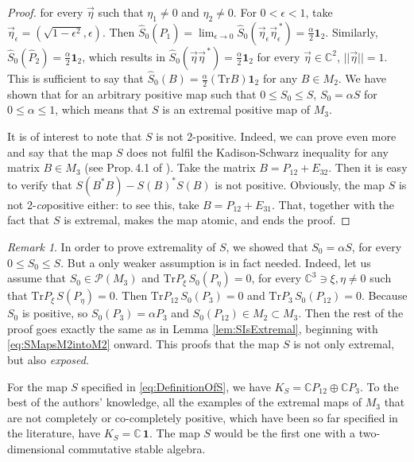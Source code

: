 \documentclass[12pt]{article}
\theoremstyle{plain}
\theoremstyle{definition}
\theoremstyle{remark}
\newtheorem*{remark*}{Remark}
\numberwithin{equation}{section}
\begin{document}
\begin{proof}
for every $\vec{\eta}$ such that $\eta_{1} \neq 0$ and $\eta_{2} \neq 0$.
For $0 \!<\!\epsilon \!<\! 1$,
take $\vec{\eta}_{\epsilon} = (\sqrt{1 - \epsilon^{2}}, \epsilon)$.
Then $\hat{S}_{0} (\hat{P}_{1}) = 
\lim_{\epsilon \rightarrow 0} \hat{S}_{0}
    (\vec{\eta}_{\epsilon} \vec{\eta}_{\epsilon}^{\,*}) =
\frac{\alpha}{2} \mathbf{1}_{2}$. 
Similarly,
$\hat{S}_{0} (\hat{P}_{2}) = \frac{\alpha}{2} \mathbf{1}_{2}$,
which results in 
$\hat{S}_{0} (\vec{\eta} \vec{\eta}^{\,*}) = \frac{\alpha}{2} \mathbf{1}_{2}$
for every $\vec{\eta} \in \mathbb{C}^{2}$,
$||\vec{\eta}|| = 1$.
This is sufficient to say that 
$\hat{S}_{0}(B) = \frac{\alpha}{2} (\text{Tr} B) \mathbf{1}_{2}$
for any $B \in M_{2}$.
We have shown that for an arbitrary positive map such that
$0 \leq S_{0} \leq S$, 
$S_{0} = \alpha S$ for $0 \leq \alpha \leq 1$,
which means that $S$ is an extremal positive map of $M_{3}$.

It is of interest to note that $S$ is not 2-positive.
Indeed,
we can prove even more and say that 
the map $S$ does not fulfil the Kadison-Schwarz inequality 
for any matrix $B \in M_{3}$
(see Prop.\,4.1 of \cite{choi1980some}).
Take the matrix
$B = P_{12} + E_{32}$.
Then it is easy to verify that 
$S(B^{*} B) - S(B)^{*} S(B)$
is not positive.
Obviously, the map $S$ is
not 2-\emph{co}positive either:
to see this, take $B = P_{12} + E_{31}$.
That, together with the fact that $S$ is extremal,
makes the map atomic, and ends the proof.
\end{proof}

\begin{remark*}
In order to prove extremality of $S$,
we showed that $S_{0} = \alpha S$,
for every $0 \leq S_{0} \leq S$.
But a only weaker assumption is in fact needed.
Indeed, let us assume that $S_{0} \in \mathcal{P}(M_{3})$ and
$\text{Tr} P_{\xi} \, S_{0}(P_{\eta}) = 0$,
for every $\mathbb{C}^{3} \ni \xi,\eta \neq 0$
such that $\text{Tr} P_{\xi} \, S(P_{\eta}) = 0$.
Then $\text{Tr} P_{12} \, S_{0}(P_{3}) = 0$ and
$\text{Tr} P_{3} \, S_{0}(P_{12}) = 0$.
Because $S_{0}$ is positive, so $S_{0}(P_{3}) = \alpha P_{3}$
and $S_{0}(P_{12}) \in M_{2} \! \subset \! M_{3}$.
Then the rest of the proof goes exactly the same as in 
Lemma \ref{lem:SIsExtremal}, 
beginning with \eqref{eq:SMapsM2intoM2} onward.
This proofs that the map $S$
is not only extremal, but also \emph{exposed}.
\end{remark*}

For the map $S$ specified in \eqref{eq:DefinitionOfS}, we have
$K_{S}= \mathbb{C} P_{12} \oplus \mathbb{C} P_{3}$.
To the best of the authors' knowledge,
all the examples of the extremal maps of $M_{3}$
that are not completely or co-completely positive,
which have been so far specified in the literature,
have $K_{S} = \mathbb{C} \, \mathbf{1}$.
The map $S$ would be the first one
with a two-dimensional commutative stable algebra.
\end{document}
